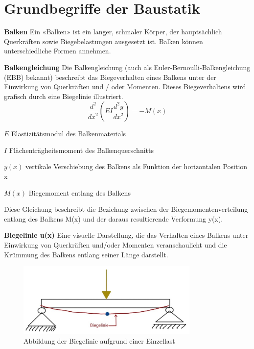 %
%
%
%
\section{Grundbegriffe der Baustatik}
\label{balken:section:teil1}
\textbf{Balken}
Ein «Balken» ist ein langer, schmaler Körper, der hauptsächlich Querkräften sowie Biegebelastungen ausgesetzt ist.
Balken können unterschiedliche Formen annehmen.

\textbf{Balkengleichung}
Die Balkengleichung (auch als Euler-Bernoulli-Balkengleichung (EBB) bekannt) beschreibt das Biegeverhalten eines Balkens unter der Einwirkung von Querkräften und / oder Momenten.
Dieses Biegeverhaltens wird grafisch durch eine Biegelinie illustriert.
\begin{equation}
	\frac{d^2}{{dx}^2}\left(EI\frac{d^2y}{{dx}^2}\right)
	=-M(x)
\end{equation}

$E$ Elastizitätsmodul des Balkenmaterials

$I$ Flächenträgheitsmoment des Balkenquerschnitts

$y(x)$ vertikale Verschiebung des Balkens als Funktion der horizontalen Position x

$M(x)$ Biegemoment entlang des Balkens

Diese Gleichung beschreibt die Beziehung zwischen der Biegemomentenverteilung entlang des Balkens M(x) und der daraus resultierende Verformung y(x).

\textbf{Biegelinie u(x)}
Eine visuelle Darstellung, die das Verhalten eines Balkens unter Einwirkung von Querkräften und/oder Momenten veranschaulicht und die Krümmung des Balkens entlang seiner Länge darstellt.
\begin{figure} [h]
	\centering
	\includegraphics[width=0.8\textwidth]{papers/balken/images/teil1/Biegelinie1.jpg}
	\caption{Abbildung der Biegelinie aufgrund einer Einzellast}
	\label{fig:Abbildung der Biegelinie aufgrund einer Einzellast}
\end{figure}

